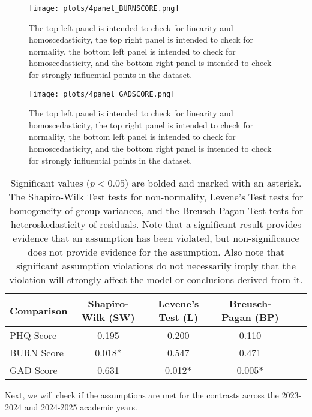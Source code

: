 \documentclass{article}
\begin{document}
\begin{figure}[H]
    \centering
    \texttt{[image: plots/4panel\_BURNSCORE.png]}
    \caption{The top left panel is intended to check for linearity and homoscedasticity, the top right panel is intended to check for normality, the bottom left panel is intended to check for homoscedasticity, and the bottom right panel is intended to check for strongly influential points in the dataset.}
    \label{fig:burn_diag}
\end{figure}

\begin{figure}[H]
    \centering
    \texttt{[image: plots/4panel\_GADSCORE.png]}
    \caption{The top left panel is intended to check for linearity and homoscedasticity, the top right panel is intended to check for normality, the bottom left panel is intended to check for homoscedasticity, and the bottom right panel is intended to check for strongly influential points in the dataset.}
    \label{fig:gad_diag}
\end{figure}



\begin{table}[H]
    \centering
    \begin{tabular}{lccccc}
    \hline
    Comparison & Shapiro-Wilk (SW) & Levene's Test (L) & Breusch-Pagan (BP)  \\
    \hline
    PHQ Score & 0.195 & 0.200 & 0.110 \\
    BURN Score & 0.018* & 0.547 & 0.471  \\ 
    GAD Score & 0.631 & 0.012* & 0.005* \\
    \hline
    \end{tabular}
    \caption{Significant values ($p < 0.05$) are bolded and marked with an asterisk. The Shapiro-Wilk Test tests for non-normality, Levene's Test tests for homogeneity of group variances, and the Breusch-Pagan Test tests for heteroskedasticity of residuals. Note that a significant result provides evidence that an assumption has been violated, but non-significance does not provide evidence for the assumption. Also note that significant assumption violations do not necessarily imply that the violation will strongly affect the model or conclusions derived from it.}
    \label{tab:firstYearAssump}
\end{table}

Next, we will check if the assumptions are met for the contrasts across the 2023-2024 and 2024-2025 academic years.
\end{document}
